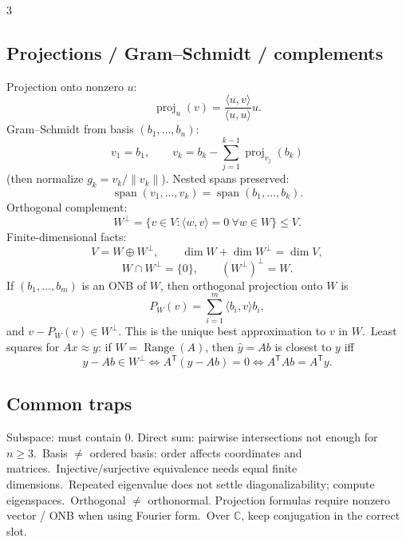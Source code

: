 \documentclass[10pt]{article}
\newcommand{\C}{\mathbb{C}}
\newcommand{\Range}{\operatorname{Range}}
\newcommand{\spann}{\operatorname{span}}
\newcommand{\proj}{\operatorname{proj}}
\newcommand{\ip}[2]{\langle #1,#2\rangle}
\begin{document}
\begin{multicols}{3}
\subsection*{Projections / Gram--Schmidt / complements}
Projection onto nonzero $u$:
\[
\proj_u(v)=\frac{\ip{u}{v}}{\ip{u}{u}}u.
\]
Gram--Schmidt from basis $(b_1,\dots,b_n)$:
\[
v_1=b_1,\qquad v_k=b_k-\sum_{j=1}^{k-1}\proj_{v_j}(b_k)
\]
(then normalize $g_k=v_k/\|v_k\|$). Nested spans preserved:
\[
\spann(v_1,\dots,v_k)=\spann(b_1,\dots,b_k).
\]
Orthogonal complement:
\[
W^\perp=\{v\in V:\ip{w}{v}=0\ \forall w\in W\}\le V.
\]
Finite-dimensional facts:
\[
V=W\oplus W^\perp,\qquad \dim W+\dim W^\perp=\dim V,
\]
\[
W\cap W^\perp=\{0\},\qquad (W^\perp)^\perp=W.
\]
If $(b_1,\dots,b_m)$ is an ONB of $W$, then orthogonal projection onto $W$ is
\[
P_W(v)=\sum_{i=1}^m \ip{b_i}{v}b_i,
\]
and $v-P_W(v)\in W^\perp$. This is the unique best approximation to $v$ in $W$.\
Least squares for $Ax\approx y$: if $W=\Range(A)$, then $\hat y=Ab$ is closest to $y$ iff
\[
y-Ab\in W^\perp\iff A^{\mathsf T}(y-Ab)=0\iff A^{\mathsf T}Ab=A^{\mathsf T}y.
\]

\subsection*{Common traps}
Subspace: must contain $0$. Direct sum: pairwise intersections not enough for $n\ge 3$.\
Basis $\neq$ ordered basis: order affects coordinates and matrices.\
Injective/surjective equivalence needs equal finite dimensions.\
Repeated eigenvalue does not settle diagonalizability; compute eigenspaces.\
Orthogonal $\neq$ orthonormal. Projection formulas require nonzero vector / ONB when using Fourier form.\
Over $\C$, keep conjugation in the correct slot.

\end{multicols}
\end{document}
